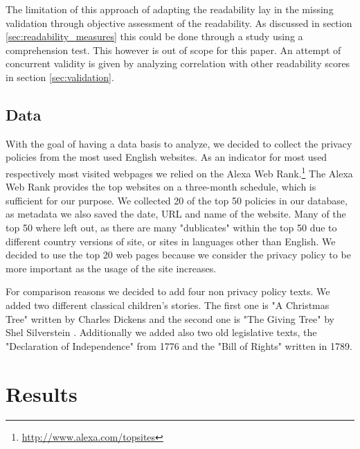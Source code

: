 \documentclass[runningheads,a4paper]{llncs}
\begin{document}
The limitation of this approach of adapting the readability lay in the missing validation through objective assessment of the readability. As discussed in section \ref{sec:readability_measures} this could be done through a study using a comprehension test. This however is out of scope for this paper. An attempt of concurrent validity is given by analyzing correlation with other readability scores in section \ref{sec:validation}.

\subsection{Data}\label{sec:data}

With the goal of having a data basis to analyze, we decided to collect the privacy policies from the most used English websites. As an indicator for most used respectively most visited webpages we relied on the Alexa Web Rank.\footnote{\url{http://www.alexa.com/topsites}} The Alexa Web Rank provides the top websites on a three-month schedule, which is sufficient for our purpose. We collected 20 of the top 50 policies in our database, as metadata we also saved the date, URL and name of the website. Many of the top 50 where left out, as there are many "dublicates" within the top 50 due to different country versions of site, or sites in languages other than English. We decided to use the top 20 web pages because we consider the privacy policy to be more important as the usage of the site increases.

For comparison reasons we decided to add four non privacy policy texts. We added two different classical children's stories. The first one is "A Christmas Tree" written by Charles Dickens \cite{Dickens1988} and the second one is "The Giving Tree" by Shel Silverstein \cite{Silverstein1964}. 
Additionally we added also two old legislative texts, the "Declaration of Independence" from 1776 \cite{decindependence} and the "Bill of Rights" \cite{billofrights} written in 1789.

\section{Results} \label{sec:results}
\end{document}
